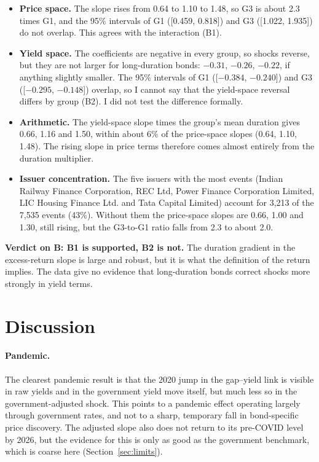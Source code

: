 \documentclass[a4paper,11pt]{article}
\begin{document}
\begin{itemize}
	\item \textbf{Price space.} The slope rises from 0.64 to 1.10 to 1.48, so G3 is about 2.3 times G1, and the 95\% intervals of G1 ([0.459, 0.818]) and G3 ([1.022, 1.935]) do not overlap. This agrees with the interaction (B1).
	\item \textbf{Yield space.} The coefficients are negative in every group, so shocks reverse, but they are not larger for long-duration bonds: $-0.31$, $-0.26$, $-0.22$, if anything slightly smaller. The 95\% intervals of G1 ([$-0.384$, $-0.240$]) and G3 ([$-0.295$, $-0.148$]) overlap, so I cannot say that the yield-space reversal differs by group (B2). I did not test the difference formally.
	\item \textbf{Arithmetic.} The yield-space slope times the group's mean duration gives 0.66, 1.16 and 1.50, within about 6\% of the price-space slopes (0.64, 1.10, 1.48). The rising slope in price terms therefore comes almost entirely from the duration multiplier.
	\item \textbf{Issuer concentration.} The five issuers with the most events (Indian Railway Finance Corporation, REC Ltd, Power Finance Corporation Limited, LIC Housing Finance Ltd. and Tata Capital Limited) account for 3,213 of the 7,535 events (43\%). Without them the price-space slopes are 0.66, 1.00 and 1.30, still rising, but the G3-to-G1 ratio falls from 2.3 to about 2.0.
\end{itemize}

\textbf{Verdict on B: B1 is supported, B2 is not.} The duration gradient in the excess-return slope is large and robust, but it is what the definition of the return implies. The data give no evidence that long-duration bonds correct shocks more strongly in yield terms.

\section{Discussion}
\paragraph{Pandemic.} The clearest pandemic result is that the 2020 jump in the gap--yield link is visible in raw yields and in the government yield move itself, but much less so in the government-adjusted shock. This points to a pandemic effect operating largely through government rates, and not to a sharp, temporary fall in bond-specific price discovery. The adjusted slope also does not return to its pre-COVID level by 2026, but the evidence for this is only as good as the government benchmark, which is coarse here (Section~\ref{sec:limits}).
\end{document}
